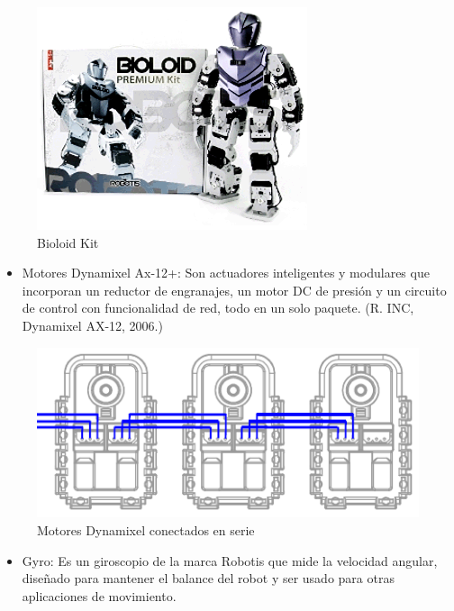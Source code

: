 \begin{figure}[hbtp]
\caption{Bioloid Kit}
\centering
\includegraphics[scale=0.5]{imagenes/product_bioloid17.png}
\end{figure}

\begin{itemize}

\item Motores Dynamixel Ax-12+: Son actuadores inteligentes y modulares que incorporan un reductor de engranajes, un motor DC de presión y un circuito de control con funcionalidad de red, todo en un solo paquete. (R. INC, Dynamixel AX-12, 2006.)
\end{itemize}

\begin{figure}[hbtp]
\caption{Motores Dynamixel conectados en serie}
\centering
\includegraphics[scale=0.5]{imagenes/AX-12_serie.png}
\end{figure}

\begin{itemize}
\item Gyro: Es un giroscopio de la marca Robotis que mide la velocidad angular, diseñado para mantener el balance del robot y ser usado para otras aplicaciones de movimiento. 

\end{itemize}

